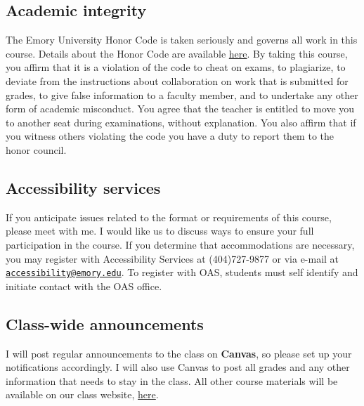 \documentclass[11pt,]{article}
\begin{document}
\hypertarget{academic-integrity}{%
\subsection{Academic integrity}\label{academic-integrity}}

The Emory University Honor Code is taken seriously and governs all work
in this course. Details about the Honor Code are available
\href{http://catalog.college.emory.edu/academic/policies-regulations/honor-code.html}{here}.
By taking this course, you affirm that it is a violation of the code to
cheat on exams, to plagiarize, to deviate from the instructions about
collaboration on work that is submitted for grades, to give false
information to a faculty member, and to undertake any other form of
academic misconduct. You agree that the teacher is entitled to move you
to another seat during examinations, without explanation. You also
affirm that if you witness others violating the code you have a duty to
report them to the honor council.

\hypertarget{accessibility-services}{%
\subsection{Accessibility services}\label{accessibility-services}}

If you anticipate issues related to the format or requirements of this
course, please meet with me. I would like us to discuss ways to ensure
your full participation in the course. If you determine that
accommodations are necessary, you may register with Accessibility
Services at (404)727-9877 or via e-mail at
\href{mailto:accessibility@emory.edu}{\nolinkurl{accessibility@emory.edu}}.
To register with OAS, students must self identify and initiate contact
with the OAS office.

\hypertarget{class-wide-announcements}{%
\subsection{Class-wide announcements}\label{class-wide-announcements}}

I will post regular announcements to the class on \textbf{Canvas}, so
please set up your notifications accordingly. I will also use Canvas to
post all grades and any other information that needs to stay in the
class. All other course materials will be available on our class
website, \href{https://econ372s23.classes.ianmccarthyecon.com/}{here}.
\end{document}
